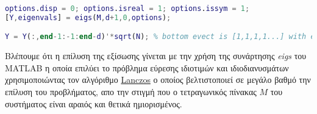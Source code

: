 \begin{lstlisting}[language=Matlab]
options.disp = 0; options.isreal = 1; options.issym = 1; 
[Y,eigenvals] = eigs(M,d+1,0,options);

Y = Y(:,end-1:-1:end-d)'*sqrt(N); % bottom evect is [1,1,1,1...] with eval 0
\end{lstlisting}
Βλέπουμε ότι η επίλυση της εξίσωσης γίνεται με την χρήση της συνάρτησης \textlatin{\textit{eigs}} του \textlatin{MATLAB} η οποία επιλύει το πρόβλημα εύρεσης ιδιοτιμών και ιδιοδιανυσμάτων χρησιμοποιώντας τον αλγόριθμο \href{https://en.wikipedia.org/wiki/Lanczos_algorithm}{\textlatin{Lanczos}}\cite{6} ο οποίος βελτιστοποιεί σε μεγάλο βαθμό την επίλυση του προβλήματος, απο την στιγμή που ο τετραγωνικός πίνακας $M$ του συστήματος είναι αραιός και θετικά ημιορισμένος.
